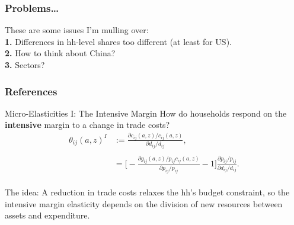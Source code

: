\documentclass[9pt,pdftex,aspectratio=1610]{beamer}
\theoremstyle{definition}
\begin{document}

\begin{frame}[t]
\frametitle{Problems\ldots}
\smallskip
These are some issues I'm mulling over:\\
\bigskip
\textbf{1.} Differences in hh-level shares too different (at least for US).\\
\bigskip
\textbf{2.} How to think about China?\\
\bigskip
\textbf{3.} Sectors?\\
\end{frame}




\appendix

\setcounter{finalframe}{\value{framenumber}}

\begin{frame}[allowframebreaks]
\frametitle{References}
\scriptsize

\end{frame}



\begin{frame}[t]{Micro-Elasticities I: The Intensive Margin}
\smallskip
How do households respond on the \textbf{intensive} margin to a change in trade costs?
\begin{align*}
\theta_{ij}(a,z)^{I} & := \frac{\partial c_{ij}(a,z)/ c_{ij}(a,z)}{\partial d_{ij} / d_{ij}}, \\
\\
& = \bigg [-\frac{\partial g_{ij}(a,z)/ p_{ij}c_{ij}(a,z)}{\partial p_{ij}/ p_{ij}} - 1 \bigg ]\frac{\partial p_{ij}/p_{ij}}{\partial d_{ij}/ d_{ij}}.
\end{align*}\\
\bigskip
\medskip
The idea: A reduction in trade costs relaxes the hh's budget constraint, so the intensive margin elasticity depends on the division of new resources between assets and expenditure.
\end{frame}
\end{document}
